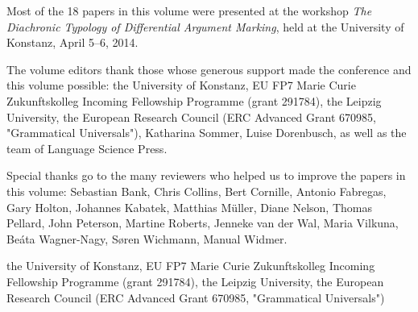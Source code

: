\begin{refsection}

Most of the 18 papers in this volume were presented at the workshop \emph{The Diachronic Typology of Differential Argument Marking}, held at the University of Konstanz, April 5–6, 2014.

The volume editors thank those whose generous support made the conference and this volume possible: 
the University of Konstanz, EU FP7 Marie Curie Zukunftskolleg Incoming Fellowship Programme (grant 291784), the Leipzig University, the European Research Council (ERC Advanced Grant 670985, "Grammatical Universals"), Katharina Sommer, Luise Dorenbusch, as well as the team of Language Science Press.

Special thanks go to the many reviewers who helped us to improve the papers in this volume: Sebastian Bank, Chris Collins, Bert Cornille, Antonio Fabregas, Gary Holton, Johannes Kabatek, Matthias Müller, Diane Nelson, Thomas Pellard, John Peterson, Martine Roberts, Jenneke van der Wal, Maria Vilkuna, Beáta Wagner-Nagy, Søren Wichmann, Manual Widmer.

the University of Konstanz, EU FP7 Marie Curie Zukunftskolleg Incoming Fellowship Programme (grant 291784), the Leipzig University, the European Research Council (ERC Advanced Grant 670985, "Grammatical Universals")
 
\end{refsection}

